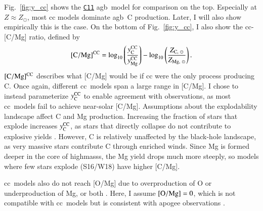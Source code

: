 \documentclass[12pt,oneside,letterpaper]{report}
\newcommand{\cc}{\gls{cc}}
\newcommand{\Cc}{\Gls{cc}}
\newcommand{\agb}{\gls{agb}}
\newcommand{\apogee}{\gls{apogee}}
\newcommand{\cxi}{\texttt{\hyperlink{C11}{C11}}}
\newcommand{\Ycc}{\ensuremath{y_{\rm C}^{\rm CC}}}
\newcommand{\Yoc}{\ensuremath{y_{\rm Mg}^{\rm CC}}}
\newcommand{\sun}{\odot}
\begin{document}
Fig.~\ref{fig:y_cc} shows the \cxi{} \agb\ model for comparison on the top. Especially at $Z\approx Z_\odot$, most \cc{} models dominate \agb\ C production. Later, I will also show empirically this is the case.
On the bottom of Fig.~\ref{fig:y_cc}, I also show the \cc{}-[C/Mg] ratio, defined by
\begin{equation}\label{eq:c_mg_cc}
    {\rm [C/Mg]^{CC}} = \log_{10}\left( \frac{\Ycc}{\Yoc}\right) - \log_{10} \left( \frac{Z_{{\rm C},\ \sun }}{Z_{{\rm Mg},\ \sun }} \right).
\end{equation}
${\rm [C/Mg]^{CC}}$ describes what [C/Mg] would be if \cc{} were the only process producing C.
Once again, different \cc\ models span a large range in [C/Mg]. 
I chose to instead parameterize $\Ycc$ to enable agreement with observations, as most \cc\ models fail to achieve near-solar [C/Mg].
Assumptions about the explodability landscape affect C and Mg production. Increasing the fraction of stars that explode increases $\Ycc$, as stars that directly collapse do not contribute to explosive yields \citep{emily+21}. However, C is relatively unaffected by the black-hole landscape, as very massive stars contribute C through enriched winds. Since Mg is formed deeper in the core of \glspl{highmass}, the Mg yield drops much more steeply, so models where few stars explode (S16/W18) have higher [C/Mg].

\Cc\ models also do not reach [O/Mg] due to overproduction of O or underproduction of Mg, or both \citep{emily+21}. Here, I assume ${\rm [O/Mg]} = 0$, which is not compatible with \cc\ models but is consistent with \apogee{} observations \citep{weinberg+19, weinberg+22}.
    
\end{document}
